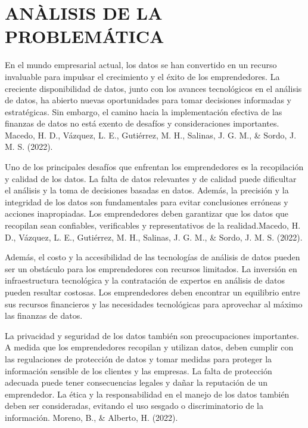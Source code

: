 \documentclass[
  letterpaper,
  DIV=11,
  numbers=noendperiod]{scrreprt}
\begin{document}
\hypertarget{anuxe0lisis-de-la-problemuxe1tica}{%
\section{ANÀLISIS DE LA
PROBLEMÁTICA}\label{anuxe0lisis-de-la-problemuxe1tica}}

En el mundo empresarial actual, los datos se han convertido en un
recurso invaluable para impulsar el crecimiento y el éxito de los
emprendedores. La creciente disponibilidad de datos, junto con los
avances tecnológicos en el análisis de datos, ha abierto nuevas
oportunidades para tomar decisiones informadas y estratégicas. Sin
embargo, el camino hacia la implementación efectiva de las finanzas de
datos no está exento de desafíos y consideraciones importantes. Macedo,
H. D., Vázquez, L. E., Gutiérrez, M. H., Salinas, J. G. M., \& Sordo, J.
M. S. (2022).

Uno de los principales desafíos que enfrentan los emprendedores es la
recopilación y calidad de los datos. La falta de datos relevantes y de
calidad puede dificultar el análisis y la toma de decisiones basadas en
datos. Además, la precisión y la integridad de los datos son
fundamentales para evitar conclusiones erróneas y acciones inapropiadas.
Los emprendedores deben garantizar que los datos que recopilan sean
confiables, verificables y representativos de la realidad.Macedo, H. D.,
Vázquez, L. E., Gutiérrez, M. H., Salinas, J. G. M., \& Sordo, J. M. S.
(2022).

Además, el costo y la accesibilidad de las tecnologías de análisis de
datos pueden ser un obstáculo para los emprendedores con recursos
limitados. La inversión en infraestructura tecnológica y la contratación
de expertos en análisis de datos pueden resultar costosas. Los
emprendedores deben encontrar un equilibrio entre sus recursos
financieros y las necesidades tecnológicas para aprovechar al máximo las
finanzas de datos.

La privacidad y seguridad de los datos también son preocupaciones
importantes. A medida que los emprendedores recopilan y utilizan datos,
deben cumplir con las regulaciones de protección de datos y tomar
medidas para proteger la información sensible de los clientes y las
empresas. La falta de protección adecuada puede tener consecuencias
legales y dañar la reputación de un emprendedor. La ética y la
responsabilidad en el manejo de los datos también deben ser
consideradas, evitando el uso sesgado o discriminatorio de la
información. Moreno, B., \& Alberto, H. (2022).
\end{document}
